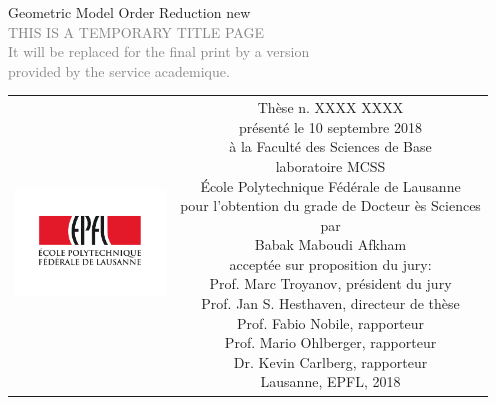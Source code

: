\begin{titlepage}
\begin{center}
\sffamily


\null\vspace{2cm}
{\huge Geometric Model Order Reduction new} \\[24pt] 
\textcolor{gray}{\small{THIS IS A TEMPORARY TITLE PAGE \\ It will be replaced for the final print by a version \\ provided by the service academique.}}
    
\vfill

\begin{tabular} {cc}
\parbox{0.3\textwidth}{\includegraphics[width=4cm]{images/epfl}}
&
\parbox{0.7\textwidth}{%
	Thèse n. XXXX XXXX\\
	présenté le 10 septembre 2018\\
	à la Faculté des Sciences de Base\\
	laboratoire MCSS\\
%
	École Polytechnique Fédérale de Lausanne\\[6pt]
	pour l'obtention du grade de Docteur ès Sciences\\
	par\\ [4pt]
	\null \hspace{3em} Babak Maboudi Afkham\\[9pt]
%
\small
acceptée sur proposition du jury:\\[4pt]
%
    Prof. Marc Troyanov, président du jury\\
    Prof. Jan S. Hesthaven, directeur de thèse\\
    Prof. Fabio Nobile, rapporteur\\
    Prof. Mario Ohlberger, rapporteur\\
    Dr. Kevin Carlberg, rapporteur\\[12pt]
%
Lausanne, EPFL, 2018}
\end{tabular}
\end{center}
\vspace{2cm}
\end{titlepage}



